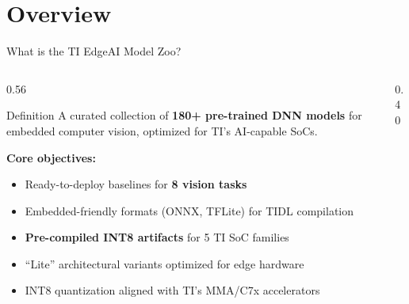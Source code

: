 \documentclass[aspectratio=169,12pt]{beamer}
\newcommand{\highlight}[1]{\textcolor{TIRed}{\textbf{#1}}}
\newcommand{\blue}[1]{\textcolor{TIBlue}{\textbf{#1}}}
\begin{document}
\section{Overview}

\begin{frame}{What is the TI EdgeAI Model Zoo?}
  \begin{columns}[T]
    \begin{column}{0.56\textwidth}
      \begin{block}{Definition}
        A curated collection of \highlight{180+ pre-trained DNN models} for
        embedded computer vision, optimized for TI's AI-capable SoCs.
      \end{block}

      \vspace{0.4cm}
      \textbf{Core objectives:}
      \begin{itemize}
        \item Ready-to-deploy baselines for \blue{8 vision tasks}
        \item Embedded-friendly formats (ONNX, TFLite) for TIDL compilation
        \item \highlight{Pre-compiled INT8 artifacts} for 5 TI SoC families
        \item ``Lite'' architectural variants optimized for edge hardware
        \item INT8 quantization aligned with TI's MMA/C7x accelerators
      \end{itemize}

      \vspace{0.3cm}
    \end{column}

    \begin{column}{0.40\textwidth}
\end{column}
\end{columns}
\end{frame}
\end{document}

